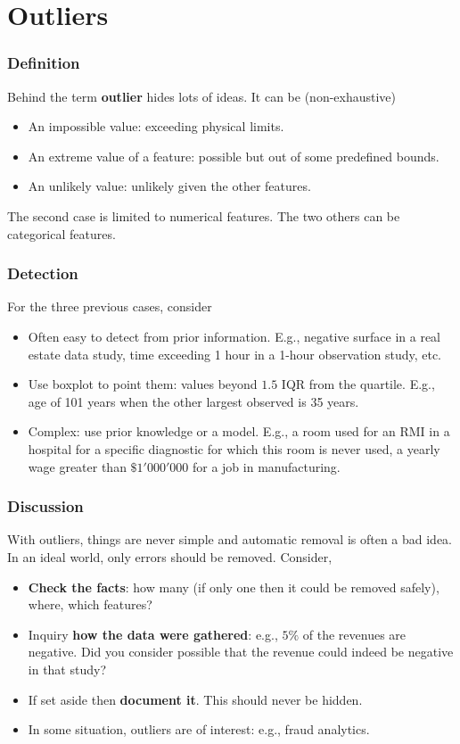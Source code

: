 \section{Outliers}
\begin{frame}
\frametitle{Definition}
Behind the term {\bf outlier} hides lots of ideas. It can be (non-exhaustive)
\begin{itemize}
\item An impossible value: exceeding physical limits.
\item An extreme value of a feature: possible but out of some predefined bounds. 
\item An unlikely value: unlikely given the other features.
\end{itemize}
The second case is limited to numerical features. The two others can be categorical features.
\end{frame}
\begin{frame}
\frametitle{Detection}
For the three previous cases, consider
\begin{itemize}
\item Often easy to detect from prior information. E.g., negative surface in a real estate data study, time exceeding 1 hour in a 1-hour observation study, etc. 
\item Use boxplot to point them: values beyond $1.5$ IQR from the quartile. E.g., age of 101 years when the other largest observed is 35 years.
\item Complex: use prior knowledge or a model. E.g., a room used for an RMI in a hospital for a specific diagnostic for which this room is never used, a yearly wage greater than $\$1'000'000$ for a job in manufacturing.
\end{itemize}
\end{frame}
\begin{frame}
\frametitle{Discussion}
With outliers, things are never simple and automatic removal is often a bad idea. In an ideal world, only errors should be removed. Consider,
\begin{itemize}
\item {\bf Check the facts}: how many (if only one then it could be removed safely), where, which features?
\item Inquiry {\bf how the data were gathered}: e.g., $5\%$ of the revenues are negative. Did you consider possible that the revenue could indeed be negative in that study?
\item If set aside then {\bf document it}. This should never be hidden.
\item In some situation, outliers are of interest: e.g., fraud analytics.
\end{itemize}
\end{frame}
